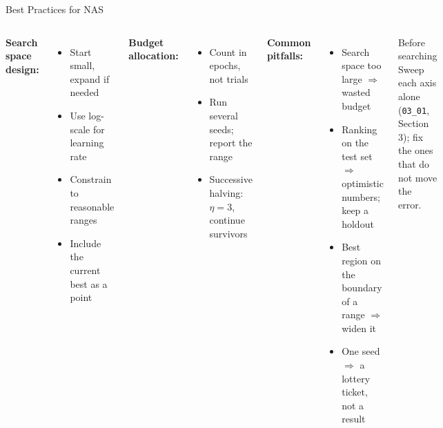 \documentclass[aspectratio=169,11pt]{beamer}
\newcommand{\emphc}[1]{\textcolor{harvardcrimson}{#1}}
\begin{document}
\begin{frame}{Best Practices for NAS}
\small
\begin{columns}[T]
\textbf{Search space design:}
\begin{itemize}
    \item Start small, expand if needed
    \item Use \emphc{log-scale} for learning rate
    \item Constrain to reasonable ranges
    \item Include the current best as a point
\end{itemize}

\vspace{0.3cm}
\textbf{Budget allocation:}
\begin{itemize}
    \item Count in epochs, not trials
    \item Run several seeds; report the range
    \item Successive halving: $\eta=3$, continue survivors
\end{itemize}

\textbf{Common pitfalls:}
\begin{itemize}
    \item Search space too large $\Rightarrow$ wasted budget
    \item Ranking on the test set $\Rightarrow$ optimistic numbers; keep a holdout
    \item Best region on the boundary of a range $\Rightarrow$ widen it
    \item One seed $\Rightarrow$ a lottery ticket, not a result
\end{itemize}

\vspace{0.3cm}
\begin{alertblock}{Before searching}
Sweep each axis alone (\texttt{03\_01}, Section 3); fix the ones that do not move the error.
\end{alertblock}
\end{columns}
\end{frame}
\end{document}

